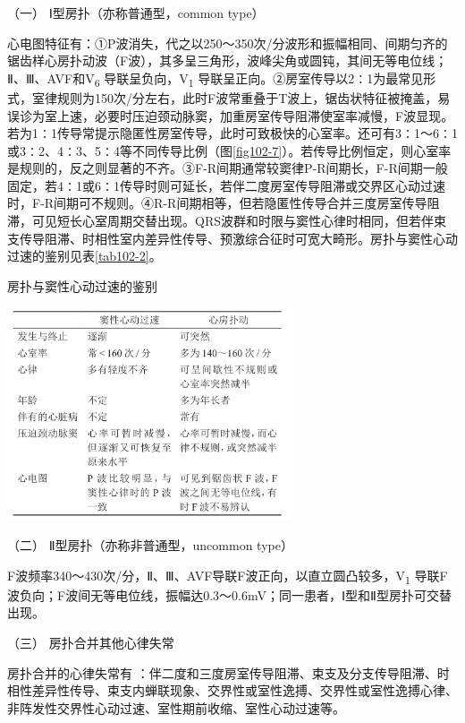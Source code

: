 \hypertarget{text00290.htmlux5cux23CHP10-2-3-2-2-1}{}
（一） Ⅰ型房扑（亦称普通型，common type）

心电图特征有：①P波消失，代之以250～350次/分波形和振幅相同、间期匀齐的锯齿样心房扑动波（F波），其多呈三角形，波峰尖角或圆钝，其间无等电位线；Ⅱ、Ⅲ、AVF和V\textsubscript{6}
导联呈负向，V\textsubscript{1}
导联呈正向。②房室传导以2∶1为最常见形式，室律规则为150次/分左右，此时F波常重叠于T波上，锯齿状特征被掩盖，易误诊为室上速，必要时压迫颈动脉窦，加重房室传导阻滞使室率减慢，F波显现。若为1∶1传导常提示隐匿性房室传导，此时可致极快的心室率。还可有3∶1～6∶1或3∶2、4∶3、5∶4等不同传导比例（图\ref{fig102-7}）。若传导比例恒定，则心室率是规则的，反之则显著的不齐。③F-R间期通常较窦律P-R间期长，F-R间期一般固定，若4∶1或6∶1传导时则可延长，若伴二度房室传导阻滞或交界区心动过速时，F-R间期可不规则。④R-R间期相等，但若隐匿性传导合并三度房室传导阻滞，可见短长心室周期交替出现。QRS波群和时限与窦性心律时相同，但若伴束支传导阻滞、时相性室内差异性传导、预激综合征时可宽大畸形。房扑与窦性心动过速的鉴别见表\ref{tab102-2}。

\begin{table}[htbp]
\centering
\caption{房扑与窦性心动过速的鉴别}
\label{tab102-2}
\includegraphics[width=3.32292in,height=2.46875in]{./images/Image00421.jpg}
\end{table}

\hypertarget{text00290.htmlux5cux23CHP10-2-3-2-2-2}{}
（二） Ⅱ型房扑（亦称非普通型，uncommon type）

F波频率340～430次/分，Ⅱ、Ⅲ、AVF导联F波正向，以直立圆凸较多，V\textsubscript{1}
导联F波负向；F波间无等电位线，振幅达0.3～0.6mV；同一患者，Ⅰ型和Ⅱ型房扑可交替出现。

\hypertarget{text00290.htmlux5cux23CHP10-2-3-2-2-3}{}
（三） 房扑合并其他心律失常

房扑合并的心律失常有
：伴二度和三度房室传导阻滞、束支及分支传导阻滞、时相性差异性传导、束支内蝉联现象、交界性或室性逸搏、交界性或室性逸搏心律、非阵发性交界性心动过速、室性期前收缩、室性心动过速等。

